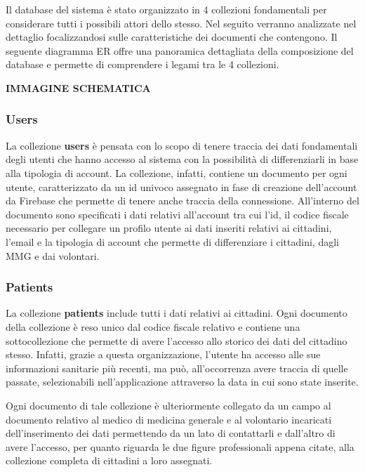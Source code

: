 \documentclass[12pt,a4paper,twoside,openright,titlepage]{book}
\begin{document}
Il database del sistema è stato organizzato in 4 collezioni fondamentali per considerare tutti i possibili attori dello stesso. Nel seguito verranno analizzate nel dettaglio focalizzandosi sulle caratteristiche dei documenti che contengono. Il seguente diagramma ER offre una panoramica dettagliata della composizione del database e permette di comprendere i legami tra le 4 collezioni.\newline

\textbf{IMMAGINE SCHEMATICA}

\subsubsection{Users}
La collezione \textbf{users} è pensata con lo scopo di tenere traccia dei dati fondamentali degli utenti che hanno accesso al sistema con la possibilità di differenziarli in base alla tipologia di account. La collezione, infatti, contiene un documento per ogni utente, caratterizzato da un id univoco assegnato in fase di creazione dell'account da Firebase che permette di tenere anche traccia della connessione. All'interno del documento sono specificati i dati relativi all'account tra cui l'id, il codice fiscale necessario per collegare un profilo utente ai dati inseriti relativi ai cittadini, l'email e la tipologia di account che permette di differenziare i cittadini, dagli MMG e dai volontari.

\subsubsection{Patients}
La collezione \textbf{patients} include tutti i dati relativi ai cittadini. Ogni documento della collezione è reso unico dal codice fiscale relativo e contiene una sottocollezione che permette di avere l'accesso allo storico dei dati del cittadino stesso. Infatti, grazie a questa organizzazione, l'utente ha accesso alle sue informazioni sanitarie più recenti, ma può, all'occorrenza avere traccia di quelle passate, selezionabili nell'applicazione attraverso la data in cui sono state inserite.\newline

Ogni documento di tale collezione è ulteriormente collegato da un campo al documento relativo al medico di medicina generale e al volontario incaricati dell'inserimento dei dati permettendo da un lato di contattarli e dall'altro di avere l'accesso, per quanto riguarda le due figure professionali appena citate, alla collezione completa di cittadini a loro assegnati.
\end{document}
